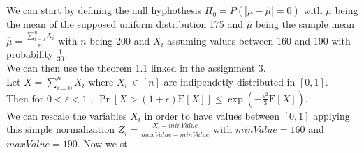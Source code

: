 \documentclass{article}
\begin{document}
\section{}
We can start by defining the null hyphothesis $H_0=P(|\mu-\hat{\mu}|=0)$ with $\mu$ being the mean of the supposed uniform distribution 175 and $\hat{\mu}$ being the sample mean $\hat{\mu}=\frac{\sum_{i=0}^n X_i}{n}$ with $n$ being 200 and $X_i$ assuming values between 160 and 190 with probability $\frac{1}{30}$.
\\We can then use the theorem 1.1 linked in the assignment 3.
\\Let $X=\sum_{i=0}^nX_i$ where $X_i \ \in [n]$ are indipendetly distributed in $[0,1]$.\\
Then for $0<\varepsilon<1$ , $\operatorname{Pr}[X>(1+\epsilon) \mathrm{E}[X]] \leq \exp \left(-\frac{\epsilon^2}{3} \mathrm{E}[X]\right)$.
\\We can rescale the variables $X_i$ in order to have values between $[0,1]$ applying this simple normalization $Z_i=\frac{X_i-minValue}{maxValue-minValue}$ with $minValue=160$ and $maxValue=190$.
Now we st
\end{document}
